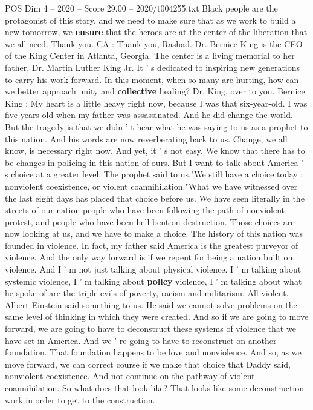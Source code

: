 \begin{textsample}{POS Dim 4 – 2020 – Score 29.00 – 2020/t004255.txt}
Black people are the protagonist of this story, and we need to make sure that as we work to build a new tomorrow, we \textbf{ensure} that the heroes are at the center of the liberation that we all need.
Thank you.
CA : Thank you, Rashad.
Dr.
Bernice King is the CEO of the King Center in Atlanta, Georgia.
The center is a living memorial to her father, Dr.
Martin Luther King Jr.
It ' s dedicated to inspiring new generations to carry his work forward.
In this moment, when so many are hurting, how can we better approach unity and \textbf{collective} healing?
Dr.
King, over to you.
Bernice King : My heart is a little heavy right now, because I was that six-year-old.
I was five years old when my father was assassinated.
And he did change the world.
But the tragedy is that we didn ' t hear what he was saying to us as a prophet to this nation.
And his words are now reverberating back to us.
Change, we all know, is necessary right now.
And yet, it ' s not easy.
We know that there has to be changes in policing in this nation of ours.
But I want to talk about America ' s choice at a greater level.
The prophet said to us,"We still have a choice today : nonviolent coexistence, or violent coannihilation."What we have witnessed over the last eight days has placed that choice before us.
We have seen literally in the streets of our nation people who have been following the path of nonviolent protest, and people who have been hell-bent on destruction.
Those choices are now looking at us, and we have to make a choice.
The history of this nation was founded in violence.
In fact, my father said America is the greatest purveyor of violence.
And the only way forward is if we repent for being a nation built on violence.
And I ' m not just talking about physical violence.
I ' m talking about systemic violence, I ' m talking about \textbf{policy} violence, I ' m talking about what he spoke of are the triple evils of poverty, racism and militarism.
All violent.
Albert Einstein said something to us.
He said we cannot solve problems on the same level of thinking in which they were created.
And so if we are going to move forward, we are going to have to deconstruct these systems of violence that we have set in America.
And we ' re going to have to reconstruct on another foundation.
That foundation happens to be love and nonviolence.
And so, as we move forward, we can correct course if we make that choice that Daddy said, nonviolent coexistence.
And not continue on the pathway of violent coannihilation.
So what does that look like?
That looks like some deconstruction work in order to get to the construction.

\end{textsample}
